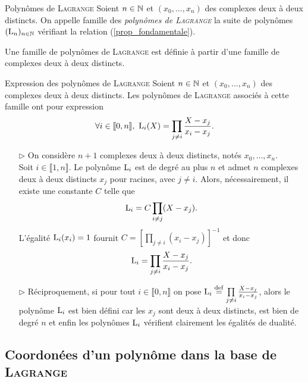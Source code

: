 \begin{defi}{Polynômes de \textsc{Lagrange}}
    Soient $n \in \mathbb{N}$ et $(x_0, \dots, x_n)$ des complexes deux à deux distincts. On appelle famille des \emph{polynômes de \textsc{Lagrange}} la suite de polynômes $(\mathrm{L}_n)_{n \in \mathbb{N}}$ vérifiant la relation (\ref{prop_fondamentale}).
\end{defi}

\begin{remarque}
    Une famille de polynômes de \textsc{Lagrange} est définie à partir d'une famille de complexes deux à deux distincts. 
\end{remarque}

\begin{prop}{Expression des polynômes de \textsc{Lagrange}}
    Soient $n \in \mathbb{N}$ et $(x_0, \dots, x_n)$ des complexes deux à deux distincts. Les polynômes de \textsc{Lagrange} associés à cette famille ont pour expression
    $$\forall i \in \llbracket 0, n \rrbracket,\ \mathrm{L}_i(X) = \prod_{j \neq i} \frac{X-x_j}{x_i - x_j}.$$
\end{prop}

\begin{preuve}
    \begin{itemize}
        \item[$\rhd$] On considère $n + 1$ complexes deux à deux distincts, notés $x_0, \dots, x_n$. \\
        Soit $i \in \llbracket 1, n \rrbracket$. Le polynôme $\mathrm{L}_i$ est de degré au plus $n$ et admet $n$ complexes deux à deux distincts $x_j$ pour racines, avec $j \not= i$. Alors, nécessairement, il existe une constante $C$ telle que 
        $$\mathrm{L}_i = C \prod_{i \not= j} (X-x_j).$$
        L'égalité $\mathrm{L}_i(x_i) = 1$ fournit $C = \left[ \prod\limits_{j \not=i}(x_i - x_j) \right]^{-1}$ et donc 
        $$\mathrm{L}_i = \prod_{j \neq i} \frac{X-x_j}{x_i - x_j}.$$
        \item[$\rhd$] Réciproquement, si pour tout $i \in \llbracket 0, n\rrbracket$ on pose $\mathrm{L}_i \overset{\mathrm{\tiny def}}{=} \prod\limits_{j \neq i} \frac{X-x_j}{x_i - x_j}$, alors le polynôme $\mathrm{L}_i$ est bien défini car les $x_j$ sont deux à deux distincts, est bien de degré $n$ et enfin les polynômes $\mathrm{L}_i$ vérifient clairement les égalités de dualité.
    \end{itemize}
\end{preuve}

\subsection{Coordonées d'un polynôme dans la base de \textsc{Lagrange}}

